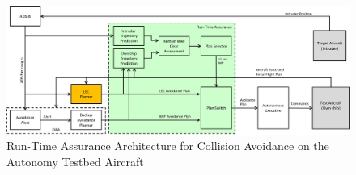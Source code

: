 \begin{figure}
	\centering
	\includegraphics[width=\textwidth]{figures/rta-arch.jpg}
	\caption{Run-Time Assurance Architecture for Collision Avoidance on the Autonomy Testbed Aircraft}
	\label{fig:rta-arch}
\end{figure}